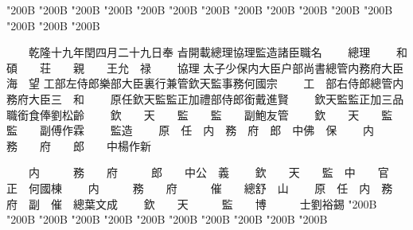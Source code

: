 \begin{正文}
\char"200B\relax{}
\char"200B\relax{}
\char"200B\relax{}
\char"200B\relax{}
\char"200B\relax{}
\char"200B\relax{}
\char"200B\relax{}
\char"200B\relax{}
\char"200B\relax{}
\char"200B\relax{}
\char"200B\relax{}
\char"200B\relax{}
\char"200B\relax{}
\char"200B\relax{}
\char"200B\relax
\par
　　乾隆十九年閏四月二十九日奉
㫖開載總理協理監造諸臣職名
　　總理
　　和　　碩　　荘　　親　　王允　禄
　　協理
{}
太子少保内大臣户部尚書總管内務府大臣海　望
工部左侍郎樂部大臣裏行兼管欽天監事務何國宗
　　工　部右侍郎總管内務府大臣三　和
　　原任欽天監監正加禮部侍郎銜戴進賢
　　欽天監監正加三品職銜食俸劉松齡
　　欽　　天　　監　　監　　副鮑友管
　　欽　　天　　監　　監　　副傅作霖
　　監造
　　原　任　内　務　府　郎　中佛　保
　　内　　　務　　府　　郎　　中楊作新
\par
　　内　　　務　　府　　　郎　　中公　義
　　欽　　天　　監　中　　官　正　何國棟
　　内　　　務　　府　　　催　　總舒　山
　　原　任　内　務　府　副　催　總葉文成
　　欽　　天　　　監　　博　　　士劉裕錫
\char"200B\relax{}
\char"200B\relax{}
\char"200B\relax{}
\char"200B\relax{}
\char"200B\relax{}
\char"200B\relax{}
\char"200B\relax{}
\char"200B\relax{}
\char"200B\relax{}
\char"200B\relax{}
\char"200B\relax
\par

\par\end{正文}\clearpage
